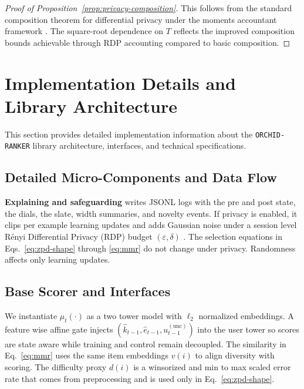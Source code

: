 \begin{proof}[Proof of Proposition~\ref{prop:privacy-composition}]
This follows from the standard composition theorem for differential privacy under the moments accountant framework \cite{Mironov2017RDP}. The square-root dependence on $T$ reflects the improved composition bounds achievable through RDP accounting compared to basic composition.
\end{proof}

\section{Implementation Details and Library Architecture}
\label{app:implementation}

This section provides detailed implementation information about the \texttt{ORCHID-RANKER} library architecture, interfaces, and technical specifications.

\subsection{Detailed Micro-Components and Data Flow}
\label{app:micro-components}

\textbf{Explaining and safeguarding} writes JSONL logs with the pre and post state, the dials, the slate, width summaries, and novelty events. If privacy is enabled, it clips per example learning updates and adds Gaussian noise under a session level Rényi Differential Privacy (RDP) budget $(\varepsilon,\delta)$ \cite{Mironov2017RDP,Abadi2016}. The selection equations in Eqs.~\eqref{eq:zpd-shape} through \eqref{eq:mmr} do not change under privacy. Randomness affects only learning updates.

\subsection{Base Scorer and Interfaces}
\label{app:base-scorer}

We instantiate \(\mu_t(\cdot)\) as a two tower model with \(\ell_2\) normalized embeddings. A feature wise affine gate injects \((\widehat{k}_{t-1},\widehat{e}_{t-1},u_{t-1}^{(\mathrm{unc})})\) into the user tower so scores are state aware while training and control remain decoupled. The similarity in Eq.~\eqref{eq:mmr} uses the same item embeddings \(v(i)\) to align diversity with scoring. The difficulty proxy \(d(i)\) is a winsorized and min to max scaled error rate that comes from preprocessing and is used only in Eq.~\eqref{eq:zpd-shape}. 


